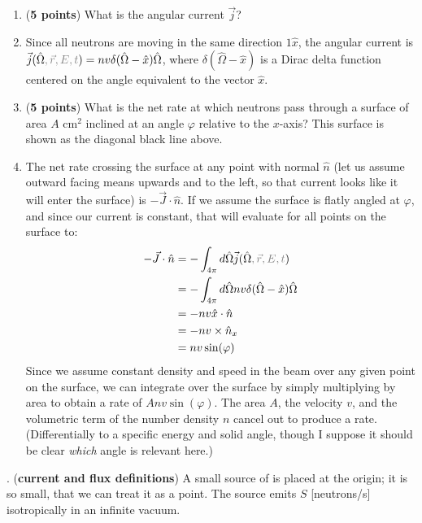 \documentclass[11pt]{article}
\newcommand{\ans}[1]{{\color{violet}#1}}
\begin{document}
\begin{enumerate}
\item [(a)] ({\bf 5 points}) What is the angular current $\vec{j}$?
\item[] \ans{Since all neutrons are moving in the same direction $1\hat{x}$, the angular current is $\vec{j}(\hat{\Omega}{\color{gray},\vec{r},E,t})=nv\delta(\hat{\Omega}-\hat{x})\hat{\Omega}$, where $\delta(\hat{\Omega}-\hat{x})$ is a Dirac delta function centered on the angle equivalent to the vector $\hat{x}$.}
\item [(b)] ({\bf 5 points}) What is the net rate at which neutrons pass through a surface of area $A$ cm$^2$ inclined at an angle $\varphi$ relative to the $x$-axis? This surface is shown as the diagonal black line above.
\item[] \ans{The net rate crossing the surface at any point with normal $\hat{n}$ (let us assume outward facing means upwards and to the left, so that current looks like it will enter the surface) is $-\vec{J}\cdot\hat{n}$. If we assume the surface is flatly angled at $\varphi$, and since our current is constant, that will evaluate for all points on the surface to:
\begin{align*}
    -\vec{J}\cdot\hat{n} &= -\int_{4\pi}d\hat{\Omega}\vec{j}(\hat{\Omega}{\color{gray},\vec{r},E,t}) \\
    &= -\int_{4\pi}d\hat{\Omega}nv\delta(\hat{\Omega}-\hat{x})\hat{\Omega}\\
    &=-nv\hat{x}\cdot\hat{n} \\
    &= -nv \times \hat{n}_x \\
    &= nv\sin(\varphi)
\end{align*}
Since we assume constant density and speed in the beam over any given point on the surface, we can integrate over the surface by simply multiplying by area to obtain a rate of $Anv\sin(\varphi)$.
The area $A$, the velocity $v$, and the volumetric term of the number density $n$ cancel out to produce a rate. (Differentially to a specific energy and solid angle, though I suppose it should be clear \emph{which} angle is relevant here.)
}
\end{enumerate}

\clearpage
{}. ({\bf current and flux definitions}) A small source of  is placed at the origin; it is so small, that we can treat it as a point. The source emits $S$ [neutrons/s] isotropically in an infinite vacuum.
\end{document}
